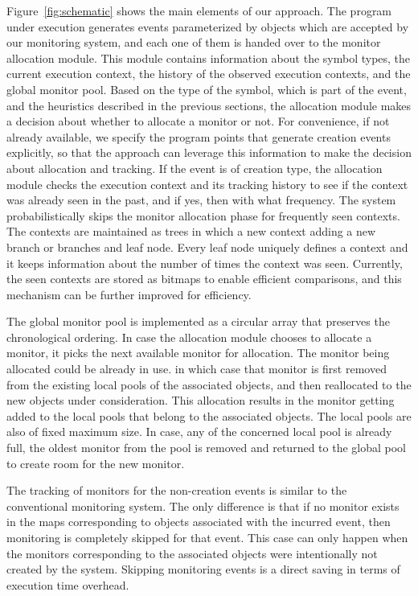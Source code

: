 Figure~\ref{fig:schematic} shows the main elements of our approach. The program 
under execution generates events parameterized by objects which are accepted by 
our monitoring system, and each one of them is handed over to the monitor 
allocation module. This module contains information about the symbol types, the current execution context, 
the history of the observed execution contexts, and the global monitor pool.
Based on the type of the symbol, which is part of the event, and the heuristics 
described in the previous sections, the allocation module makes a decision about whether to allocate a monitor or not.
For convenience, if not already available, we 
specify the program points that generate creation events explicitly, so that the 
approach can leverage this information to make the decision about allocation and tracking. 
If the event is of creation type, the allocation module checks the execution context and its 
tracking history to see if the context was already seen in the past, and if yes, 
then with what frequency. The system probabilistically skips the monitor 
allocation phase for frequently seen contexts. 
The contexts are maintained as trees in which a new context adding a new branch or branches and leaf node. 
Every leaf node uniquely defines a context and it keeps information about the 
number of times the context was seen. Currently, the seen contexts are stored as bitmaps to enable efficient
comparisons, and this mechanism can be further improved for efficiency.

The global monitor pool is implemented as a circular array that preserves 
the chronological ordering. In case the allocation module chooses to allocate a monitor,
it picks the next available monitor for allocation. The monitor being allocated could be already in use.
in which case that monitor is first removed from the existing local pools of the associated 
objects, and then reallocated to the new objects under consideration. This allocation results in the monitor
getting added to the local pools that belong to the associated objects. The local pools are also of fixed maximum size.
In case, any of the concerned local pool is already full, the oldest monitor from the pool is removed and returned to the global pool
to create room for the new monitor. 

The tracking of monitors for the non-creation events is similar to the 
conventional monitoring system. The only difference is that if no monitor exists in the maps 
corresponding to objects associated with the incurred event, then monitoring is completely 
skipped for that event. This case can only happen when the monitors corresponding to the 
associated objects were intentionally not created by the system. Skipping monitoring events is a 
direct saving in terms of execution time overhead.




